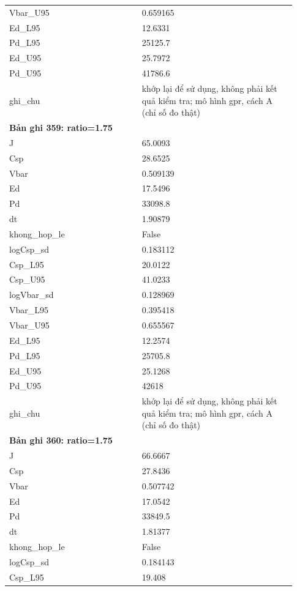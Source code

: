 \begin{longtable}{p{0.43\linewidth}p{0.50\linewidth}}
Vbar\_\allowbreak U95 & 0.659165 \\
Ed\_\allowbreak L95 & 12.6331 \\
Pd\_\allowbreak L95 & 25125.7 \\
Ed\_\allowbreak U95 & 25.7972 \\
Pd\_\allowbreak U95 & 41786.6 \\
ghi\_\allowbreak chu & khớp lại để sử dụng, không phải kết quả kiểm tra; mô hình gpr, cách A (chỉ số đo thật) \\
\midrule
\multicolumn{2}{p{0.95\linewidth}}{\textbf{Bản ghi 359: ratio=1.75}} \\
J & 65.0093 \\
Csp & 28.6525 \\
Vbar & 0.509139 \\
Ed & 17.5496 \\
Pd & 33098.8 \\
dt & 1.90879 \\
khong\_\allowbreak hop\_\allowbreak le & False \\
logCsp\_\allowbreak sd & 0.183112 \\
Csp\_\allowbreak L95 & 20.0122 \\
Csp\_\allowbreak U95 & 41.0233 \\
logVbar\_\allowbreak sd & 0.128969 \\
Vbar\_\allowbreak L95 & 0.395418 \\
Vbar\_\allowbreak U95 & 0.655567 \\
Ed\_\allowbreak L95 & 12.2574 \\
Pd\_\allowbreak L95 & 25705.8 \\
Ed\_\allowbreak U95 & 25.1268 \\
Pd\_\allowbreak U95 & 42618 \\
ghi\_\allowbreak chu & khớp lại để sử dụng, không phải kết quả kiểm tra; mô hình gpr, cách A (chỉ số đo thật) \\
\midrule
\multicolumn{2}{p{0.95\linewidth}}{\textbf{Bản ghi 360: ratio=1.75}} \\
J & 66.6667 \\
Csp & 27.8436 \\
Vbar & 0.507742 \\
Ed & 17.0542 \\
Pd & 33849.5 \\
dt & 1.81377 \\
khong\_\allowbreak hop\_\allowbreak le & False \\
logCsp\_\allowbreak sd & 0.184143 \\
Csp\_\allowbreak L95 & 19.408 \\

\end{longtable}
